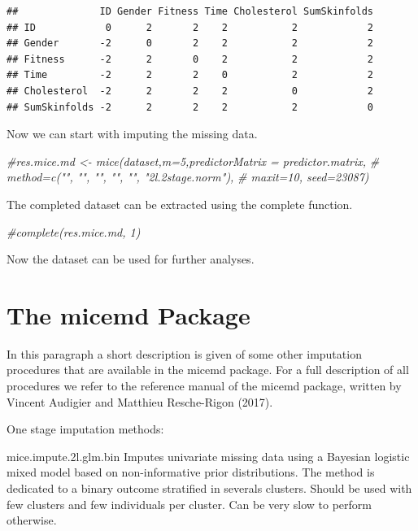 \documentclass[]{book}
\newenvironment{Shaded}{\begin{snugshade}}{\end{snugshade}}
\newcommand{\CommentTok}[1]{\textcolor[rgb]{0.56,0.35,0.01}{\textit{#1}}}
\theoremstyle{definition}
\theoremstyle{definition}
\theoremstyle{definition}
\theoremstyle{remark}
\begin{document}
\begin{verbatim}
##              ID Gender Fitness Time Cholesterol SumSkinfolds
## ID            0      2       2    2           2            2
## Gender       -2      0       2    2           2            2
## Fitness      -2      2       0    2           2            2
## Time         -2      2       2    0           2            2
## Cholesterol  -2      2       2    2           0            2
## SumSkinfolds -2      2       2    2           2            0
\end{verbatim}

Now we can start with imputing the missing data.

\begin{Shaded}
\begin{Highlighting}[]
\CommentTok{#res.mice.md <- mice(dataset,m=5,predictorMatrix = predictor.matrix,}
\CommentTok{#                     method=c("", "",  "", "", "", "2l.2stage.norm"), }
\CommentTok{#                     maxit=10, seed=23087)}
\end{Highlighting}
\end{Shaded}

The completed dataset can be extracted using the complete function.

\begin{Shaded}
\begin{Highlighting}[]
\CommentTok{#complete(res.mice.md, 1)}
\end{Highlighting}
\end{Shaded}

Now the dataset can be used for further analyses.

\section{The micemd Package}\label{the-micemd-package}

In this paragraph a short description is given of some other imputation
procedures that are available in the micemd package. For a full
description of all procedures we refer to the reference manual of the
micemd package, written by Vincent Audigier and Matthieu Resche-Rigon
(2017).

One stage imputation methods:

mice.impute.2l.glm.bin Imputes univariate missing data using a Bayesian
logistic mixed model based on non-informative prior distributions. The
method is dedicated to a binary outcome stratified in severals clusters.
Should be used with few clusters and few individuals per cluster. Can be
very slow to perform otherwise.
\end{document}
